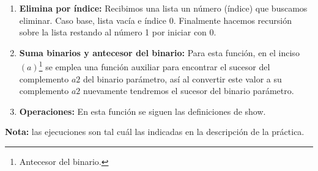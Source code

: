 \documentclass{article}
\begin{document}
\begin{enumerate}
\item \textbf{Elimina por índice:} Recibimos una lista un número (índice) que buscamos eliminar. Caso base, lista vacía e índice 0. Finalmente hacemos recursión sobre la lista restando al número 1 por iniciar con 0. 
  
  
  
\item \textbf{Suma binarios y antecesor del binario:} Para esta función, en el
  inciso $(a)$\footnote{Antecesor del binario.} se emplea una función auxiliar
  para encontrar el sucesor del complemento $a2$ del binario parámetro, así al
  convertir este valor a su complemento $a2$ nuevamente tendremos el sucesor
  del binario parámetro.
  
\item \textbf{Operaciones:} En esta función se siguen las definiciones de show.
\end{enumerate}
\textbf{Nota:} las ejecuciones son tal cuál las indicadas en la descripción de la práctica.

\begin{center}
\end{center}
\end{document}

